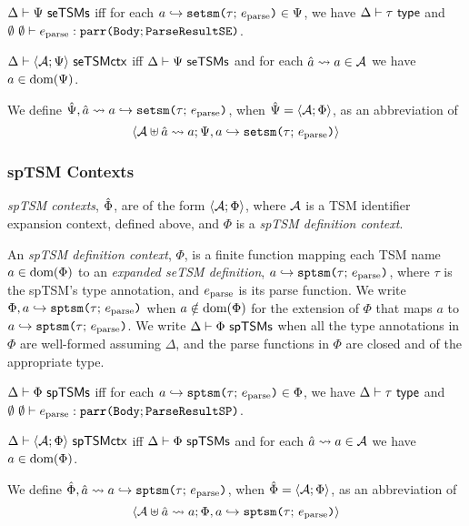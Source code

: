 \begin{definition}\label{def:seTSM-def-ctx-formation} $\Delta \vdash \Psi~\mathsf{seTSMs}$ iff for each $a \hookrightarrow \texttt{setsm}\texttt{(}\tau;\,e_\text{parse}\texttt{)} \in \Psi$, we have $\Delta \vdash \tau~\mathsf{type}$ and $\emptyset~\emptyset \vdash e_\text{parse} : \texttt{parr}\texttt{(}\mathtt{Body}; \mathtt{ParseResultSE}\texttt{)}$.\end{definition}

\begin{definition} $\Delta \vdash \langle \mathcal{A}; \Psi \rangle~\mathsf{seTSMctx}$ iff $\Delta \vdash \Psi~\mathsf{seTSMs}$ and for each $\hat{a} \leadsto a \in \mathcal{A}$ we have $a \in \text{dom}(\Psi)$.
\end{definition}

We define $\hat{\Psi}, \hat{a} \leadsto a \hookrightarrow \texttt{setsm}\texttt{(}\tau;\,e_\text{parse}\texttt{)}$, when $\hat{\Psi}=\langle \mathcal{A}; \Phi \rangle$, as an abbreviation of \[\langle \mathcal{A} \uplus \hat{a} \leadsto a; \Psi, a \hookrightarrow \texttt{setsm}\texttt{(}\tau;\,e_\text{parse}\texttt{)} \rangle\]

\begin{grayparbox}\vspace{-15px}\subsubsection{spTSM Contexts}
\emph{spTSM contexts}, $\hat\Phi$, are of the form $\langle \mathcal{A}; \Phi \rangle$, where $\mathcal{A}$ is a {TSM identifier expansion context}, defined above, and $\Phi$ is a \emph{spTSM definition context}. 

An \emph{spTSM definition context}, $\Phi$, is a finite function mapping each TSM name $a \in \text{dom}(\Phi)$ to an \emph{expanded seTSM definition}, $a \hookrightarrow \texttt{sptsm}\texttt{(}\tau;\,e_\text{parse}\texttt{)}$, where $\tau$ is the spTSM's type annotation, and $e_\text{parse}$ is its parse function. We write $\Phi, a \hookrightarrow \texttt{sptsm}\texttt{(}\tau;\,e_\text{parse}\texttt{)}$ when $a \notin \text{dom}(\Phi)$ for the extension of $\Phi$ that maps $a$ to $a \hookrightarrow \texttt{sptsm}\texttt{(}\tau;\,e_\text{parse}\texttt{)}$. We write $\Delta \vdash \Phi~\mathsf{spTSMs}$  when all the type annotations in $\Phi$ are well-formed assuming $\Delta$, and the parse functions in $\Phi$ are closed and of the appropriate type.

\begin{definition}\label{def:spTSM-def-ctx-formation} $\Delta \vdash \Phi~\mathsf{spTSMs}$ iff for each $a \hookrightarrow \texttt{sptsm}\texttt{(}\tau;\,e_\text{parse}\texttt{)} \in \Phi$, we have $\Delta \vdash \tau~\mathsf{type}$ and $\emptyset~\emptyset \vdash e_\text{parse} : \texttt{parr}\texttt{(}\mathtt{Body}; \mathtt{ParseResultSP}\texttt{)}$.\end{definition}

\begin{definition} $\Delta \vdash \langle \mathcal{A}; \Phi \rangle~\mathsf{spTSMctx}$ iff $\Delta \vdash \Phi~\mathsf{spTSMs}$ and for each $\hat{a} \leadsto a \in \mathcal{A}$ we have $a \in \text{dom}(\Phi)$.
\end{definition}

We define $\hat\Phi, \hat{a} \leadsto a \hookrightarrow \texttt{sptsm}\texttt{(}\tau;\,e_\text{parse}\texttt{)}$, when $\hat\Phi=\langle \mathcal{A}; \Phi \rangle$, as an abbreviation of \[\langle \mathcal{A} \uplus \hat{a} \leadsto a; \Phi, a \hookrightarrow \texttt{sptsm}\texttt{(}\tau;\,e_\text{parse}\texttt{)} \rangle\]
\end{grayparbox}

